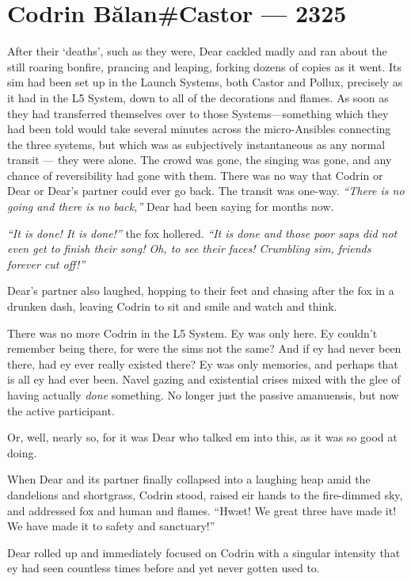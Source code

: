 \hypertarget{codrin-bux103lancastor-2325}{%
\chapter{Codrin Bălan\#Castor — 2325}\label{codrin-bux103lancastor-2325}}

After their `deaths', such as they were, Dear cackled madly and ran about the still roaring bonfire, prancing and leaping, forking dozens of copies as it went. Its sim had been set up in the Launch Systems, both Castor and Pollux, precisely as it had in the L5 System, down to all of the decorations and flames. As soon as they had transferred themselves over to those Systems---something which they had been told would take several minutes across the micro-Ansibles connecting the three systems, but which was as subjectively instantaneous as any normal transit — they were alone. The crowd was gone, the singing was gone, and any chance of reversibility had gone with them. There was no way that Codrin or Dear or Dear's partner could ever go back. The transit was one-way. \emph{``There is no going and there is no back,''} Dear had been saying for months now.

\emph{``It is done! It is done!''} the fox hollered. \emph{``It is done and those poor saps did not even get to finish their song! Oh, to see their faces! Crumbling sim, friends forever cut off!''}

Dear's partner also laughed, hopping to their feet and chasing after the fox in a drunken dash, leaving Codrin to sit and smile and watch and think.

There was no more Codrin in the L5 System. Ey was only here. Ey couldn't remember being there, for were the sims not the same? And if ey had never been there, had ey ever really existed there? Ey was only memories, and perhaps that is all ey had ever been. Navel gazing and existential crises mixed with the glee of having actually \emph{done} something. No longer just the passive amanuensis, but now the active participant.

Or, well, nearly so, for it was Dear who talked em into this, as it was so good at doing.

When Dear and its partner finally collapsed into a laughing heap amid the dandelions and shortgrass, Codrin stood, raised eir hands to the fire-dimmed sky, and addressed fox and human and flames. ``Hwæt! We great three have made it! We have made it to safety and sanctuary!''

Dear rolled up and immediately focused on Codrin with a singular intensity that ey had seen countless times before and yet never gotten used to.

